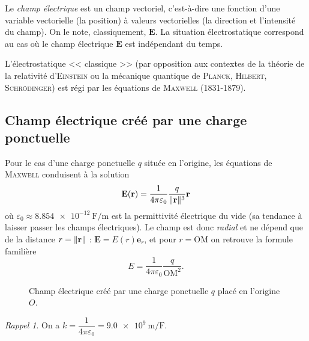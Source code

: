 \documentclass{article}
\renewcommand{\vec}[1]{\mathbf{#1}}
\renewcommand\epsilon\varepsilon
\DeclarePairedDelimiter{\norm}{\lVert}{\rVert}
\theoremstyle{definition}
\theoremstyle{remark}
\newtheorem*{rap}{Rappel}
\begin{document}
Le \textit{champ électrique} est un champ vectoriel, c'est-à-dire une fonction d'une variable vectorielle (la position) à valeurs vectorielles (la direction et l'intensité du champ). On le note, classiquement, $\vec{E}$. La situation électrostatique correspond au cas où le champ électrique $\vec{E}$ est indépendant du temps.

L'électrostatique << classique >> (par opposition aux contextes de la théorie de la relativité d'\textsc{Einstein} ou la mécanique quantique de \textsc{Planck}, \textsc{Hilbert}, \textsc{Schrödinger}) est régi par les équations de \textsc{Maxwell} (1831-1879). 


\subsection{Champ électrique créé par une charge ponctuelle}

Pour le cas d'une charge ponctuelle $q$ située en l'origine, les équations de \textsc{Maxwell} conduisent à la solution
	\[ \vec{E}(\vec{r}) = \frac{1}{4\pi\epsilon_0}\frac{q}{\norm{\vec{r}}^3}\vec{r} \]
où $\epsilon_0\approx\SI{8.854e-12}{\farad\per\meter}$ est la permittivité électrique du vide (sa tendance à laisser passer les champs électriques). Le champ est donc \textit{radial} et ne dépend que de la distance $r=\norm{\vec{r}}$ : $\vec{E} = E(r)\vec{e}_r$, et pour $r=\mathrm{OM}$ on retrouve la formule familière
	\[
    E = \frac{1}{4\pi\epsilon_0}\frac{q}{\mathrm{OM}^2}.
    \]

\begin{figure}[h]
	\centering
    \caption{Champ électrique créé par une charge ponctuelle $q$ placé en l'origine $O$.}
\end{figure}

\begin{rap}
	On a $k=\dfrac{1}{4\pi\epsilon_0}=\SI{9.0e9}{\meter\per\farad}.$
\end{rap}
\end{document}
